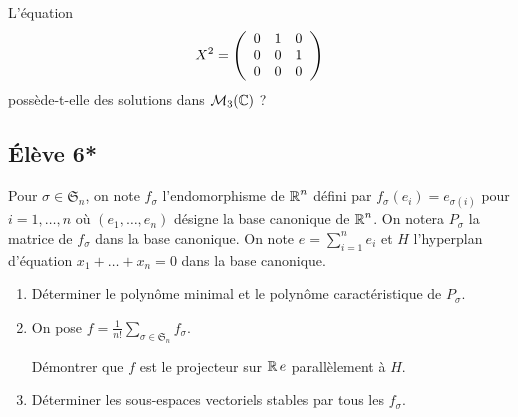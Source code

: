 \documentclass[10pt]{scrartcl}
\begin{document}
    \begin{exo}
        L'équation 
        \[
            X^2=\left(\begin{array}{c c c} 0 & 1 & 0\\ 0 & 0 & 1\\ 0 & 0 & 0\end{array}\right)
        \]
        possède-t-elle des solutions dans $\mathcal M_3(\operatorname{\mathbb C})$ ? 
    \end{exo}

    \subsection*{Élève 6*}
    \begin{exo}
        Pour $\sigma\in\mathfrak S_n$, on note $f_\sigma$ l'endomorphisme de $\operatorname{\mathbb R}^n$ 
        défini par $f_\sigma(e_i)=e_{\sigma(i)}$ pour $i=1,\dots,n$ où $(e_1,\dots,e_n)$
        désigne la base canonique de $\operatorname{\mathbb R}^n$.
        On notera $P_\sigma$ la matrice de $f_\sigma$ dans la base canonique.
        On note $e=\sum_{i=1}^ne_i$ et $H$ l'hyperplan d'équation $x_1+\dots+x_n=0$ 
        dans la base canonique. 
        \begin{enumerate}
            \item Déterminer le polynôme minimal et le polynôme caractéristique de 
            $P_\sigma$.
            \item On pose $f=\frac1{n!}\sum_{\sigma\in\mathfrak S_n}f_\sigma$. 
            
            Démontrer que $f$ est le projecteur sur $\operatorname{\mathbb R} e$ parallèlement à $H$. 
            \item Déterminer les sous-espaces vectoriels stables par tous les 
            $f_\sigma$.
        \end{enumerate}
    \end{exo}
\end{document}
